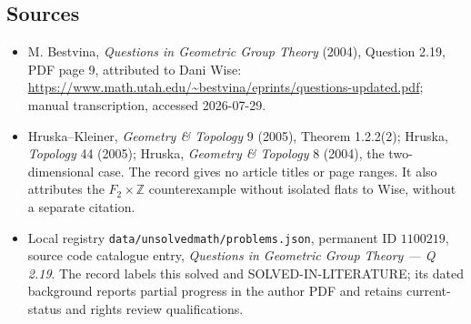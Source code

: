 \documentclass[11pt]{article}
\begin{document}
\subsection{Sources}
\begin{itemize}
\item M. Bestvina, \emph{Questions in Geometric Group Theory} (2004), Question 2.19, PDF page 9, attributed to Dani Wise: \url{https://www.math.utah.edu/~bestvina/eprints/questions-updated.pdf}; manual transcription, accessed 2026-07-29.
\item Hruska--Kleiner, \emph{Geometry \& Topology} 9 (2005), Theorem 1.2.2(2); Hruska, \emph{Topology} 44 (2005); Hruska, \emph{Geometry \& Topology} 8 (2004), the two-dimensional case. The record gives no article titles or page ranges. It also attributes the $F_2\times\mathbb Z$ counterexample without isolated flats to Wise, without a separate citation.
\item Local registry \texttt{data/unsolvedmath/problems.json}, permanent ID $1100219$, source code catalogue entry, \emph{Questions in Geometric Group Theory --- Q 2.19}. The record labels this solved and SOLVED-IN-LITERATURE; its dated background reports partial progress in the author PDF and retains current-status and rights review qualifications.
\end{itemize}
\end{document}

